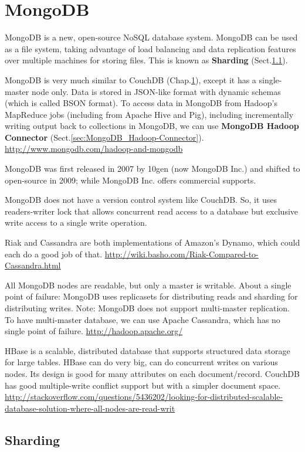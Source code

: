 \chapter{MongoDB}
\label{chap:MongoDB}

MongoDB is a new, open-source NoSQL database system. MongoDB can be used as a
file system, taking advantage of load balancing and data replication features
over multiple machines for storing files.  This is known as {\bf Sharding}
(Sect.\ref{sec:sharding}).

MongoDB is very much similar to CouchDB (Chap.\ref{chap:MongoDB}), except it has
a single-master node only. Data is stored in JSON-like format with dynamic
schemas (which is called BSON format).
To access data in MongoDB from Hadoop's MapReduce jobs (including from Apache
Hive and Pig), including incrementally writing output back to collections in
MongoDB, we can use {\bf MongoDB Hadoop Connector}
(Sect.\ref{sec:MongoDB_Hadoop-Connector}).
\url{http://www.mongodb.com/hadoop-and-mongodb}


MongoDB was first released in 2007 by 10gen (now MongoDB Inc.) and shifted to
open-source in 2009; while MongoDB Inc. offers commercial supports. 

MongoDB does not have a version control  system like CouchDB. So,
it uses readers-writer lock that allows concurrent read access to a database but
exclusive write access to a single write operation.

Riak and Cassandra are both implementations of Amazon's Dynamo, which could each
do a good job of that.
\url{http://wiki.basho.com/Riak-Compared-to-Cassandra.html}

All MongoDB nodes are readable, but only a master is writable.
About a single point of failure: MongoDB uses replicasets for distributing reads
and sharding for distributing writes. Note: MongoDB does not support
multi-master replication. To have multi-master database, we can use Apache
Cassandra, which has no single point of failure. \url{http://hadoop.apache.org/}

HBase is a scalable, distributed database that supports structured data storage
for large tables. HBase can do very big, can do concurrent writes on various
nodes. Its design is good for many attributes on each document/record.
CouchDB has good multiple-write conflict support but with a simpler document
space.
\url{http://stackoverflow.com/questions/5436202/looking-for-distributed-scalable-database-solution-where-all-nodes-are-read-writ}

\section{Sharding}
\label{sec:sharding}


